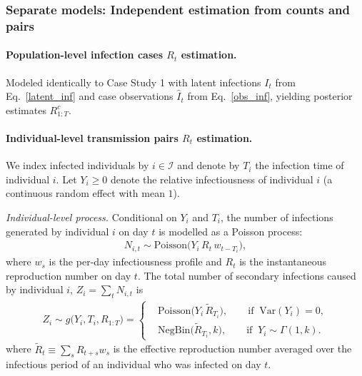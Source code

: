 \documentclass{article}
\begin{document}
\subsubsection{Separate models: Independent estimation from counts and pairs}

\paragraph{Population-level infection cases $R_t$ estimation.}
Modeled identically to Case Study 1 with latent infections $I_t$ from Eq.~\eqref{latent_inf} and case observations $\widehat{I}_t$ from  Eq.~\eqref{obs_inf}, yielding posterior estimates $R_{1:T}^c$.

\paragraph{Individual-level transmission pairs $R_t$ estimation.}
We index infected individuals by $i\in\mathcal{I}$ and denote by $T_i$ the infection time of individual $i$. Let $Y_i\ge0$ denote the relative infectiousness of individual $i$ (a continuous random effect with mean $1$).

\emph{Individual-level process.}  Conditional on $Y_i$ and $T_i$, the number of infections generated by individual $i$ on day $t$ is modelled as a Poisson process:
\begin{align}\label{cs3_ind_process}
N_{i,t} \sim \mathrm{Poisson}\!\big(Y_i\, R_t\, w_{t-T_i}\big), 
\end{align}
where $w_s$ is the per-day infectiousness profile and $R_t$ is the instantaneous reproduction number on day $t$. The total number of secondary infections caused by individual $i$, $Z_i = \sum_{t} N_{i,t}$ is
\begin{align}\label{offspring_cases}
Z_i \sim g\big(Y_i, T_i, R_{1:T}\big) =
\begin{cases}
 & \mathrm{Poisson}\!\Big( Y_i\,\tilde{R}_{T_i} \Big), 
   \qquad \text{if } ~\mathrm{Var}(Y_i)=0, \\[6pt]
 & \mathrm{NegBin}\!\Big(\tilde{R}_{T_i}, k\Big), 
   \qquad \text{if }  ~Y_i \sim \Gamma(1,k).
\end{cases}
\end{align}
where $\widetilde{R}_t \equiv \sum_{s} R_{t+s} w_s$ is the effective reproduction number averaged over the infectious period of
an individual who was infected on day $t$.
\end{document}
